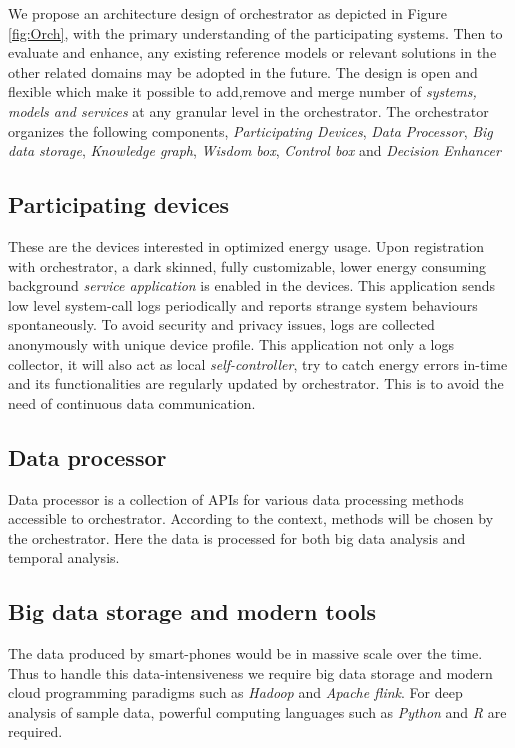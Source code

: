 		We propose an architecture design of orchestrator as depicted in Figure \ref{fig:Orch}, with the primary understanding of the participating systems. Then to evaluate and enhance, any existing reference models or relevant solutions in the other related domains may be adopted in the future. The design is open and flexible which make it possible to add,remove and merge number of \textit{systems, models and services} at any granular level in the orchestrator. The orchestrator organizes the following components, \emph{Participating Devices}, \emph{Data Processor}, \emph{Big data storage}, \emph{Knowledge graph}, \emph{Wisdom box}, \emph{Control box} and  \emph{Decision Enhancer} %
		\subsection{Participating devices}
		\label{section:partdevice}
		These are the devices interested in optimized energy usage. Upon registration with orchestrator, a dark skinned, fully customizable, lower energy consuming background \textit{service application} is enabled in the devices. This application sends low level system-call logs periodically and reports strange system behaviours spontaneously. To avoid security and privacy issues, logs are collected anonymously with unique device profile. This application not only a logs collector, it will also act as local \textit{self-controller}, try to catch energy errors in-time and its functionalities are regularly updated by orchestrator. This is to avoid the need of continuous data communication. 
		\subsection{Data processor}
		Data processor is a collection of APIs for various data processing methods accessible to orchestrator. According to the context, methods will be chosen by the orchestrator. Here the data is processed for both big data analysis and temporal analysis.
		\subsection{Big data storage and modern tools}
		The data produced by smart-phones would be in massive scale over the time. Thus to handle this data-intensiveness we require big data storage and modern cloud programming paradigms such as \emph{Hadoop} and \emph{Apache flink}. For deep analysis of sample data, powerful  computing languages such as \emph{Python} and \emph{R} are required.
